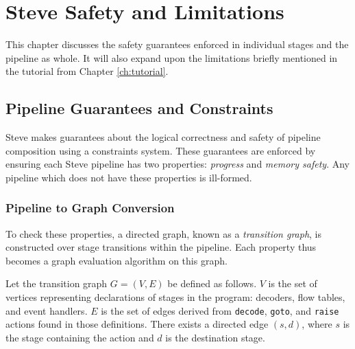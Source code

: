 \chapter{Steve Safety and Limitations} \label{ch:limits}

This chapter discusses the safety guarantees enforced in individual stages
and the pipeline as whole. It will also expand upon the limitations
briefly mentioned in the tutorial from Chapter \ref{ch:tutorial}.

\section{Pipeline Guarantees and Constraints} \label{guide:pipeline_checking}

Steve makes guarantees about the logical correctness and safety of pipeline
composition using a constraints system. These guarantees are enforced by ensuring each Steve pipeline has two properties: \textit{progress} and \textit{memory safety}. Any
pipeline which does not have these properties is ill-formed.

\subsection{Pipeline to Graph Conversion} \label{guide:pipeline_graph}

To check these properties, a directed graph, known as a \emph{transition graph}, is constructed over stage transitions within the pipeline.
Each property thus becomes a graph evaluation algorithm on this graph.

Let the transition graph $G=(V, E)$ be defined as follows. $V$ is the set of vertices representing declarations of stages in the program: decoders, flow tables, and event handlers. $E$ is the set of edges derived from
\texttt{decode}, \texttt{goto}, and \texttt{raise} actions found in those definitions. There exists a directed edge $(s, d)$, where $s$ is the stage containing the action and $d$ is the destination stage.

